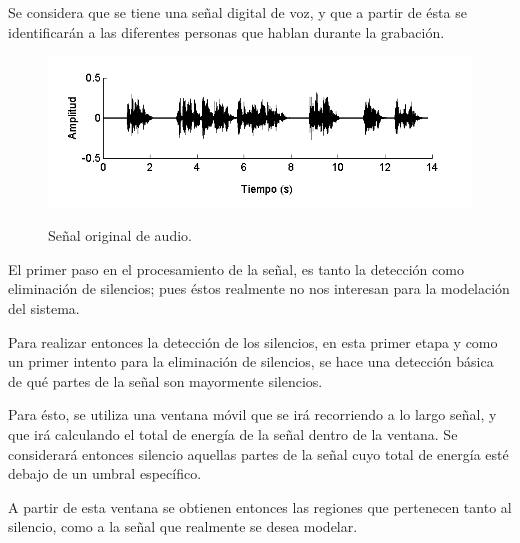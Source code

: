 Se considera que se tiene una señal digital de voz, y que a partir de ésta se identificarán a las diferentes personas que hablan durante la grabación.

\begin{figure}[bth]
  {\includegraphics[width=0.9\linewidth]{gfx/chap2/signal-orig}} \quad
  \caption{Señal original de audio.}
  \label{fig:sign_orig}
\end{figure}

El primer paso en el procesamiento de la señal, es tanto la detección como eliminación de silencios; pues éstos realmente no nos interesan para la modelación del sistema.


Para realizar entonces la detección de los silencios, en esta primer etapa y como un primer intento para la eliminación de silencios, se hace una detección básica de qué partes de la señal son mayormente silencios.

Para ésto, se utiliza una ventana móvil que se irá recorriendo a lo largo señal, y que irá calculando el total de energía de la señal dentro de la ventana. Se considerará entonces silencio aquellas partes de la señal cuyo total de energía esté debajo de un umbral específico.

A partir de esta ventana se obtienen entonces las regiones que pertenecen tanto al silencio, como a la señal que realmente se desea modelar.

